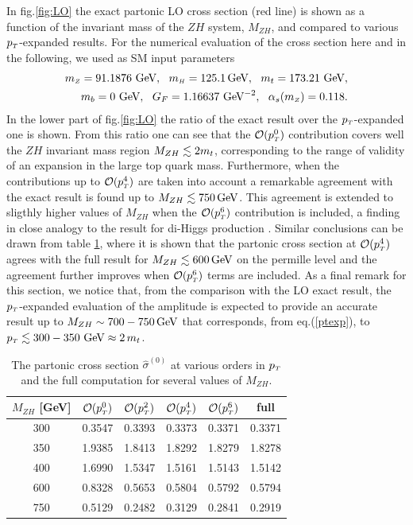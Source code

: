 In fig.\ref{fig:LO} the exact partonic LO cross section (red line) is
shown as a function of the invariant mass of the $ZH$ system, $M_{ZH}$, and
compared to various $p_{\scriptscriptstyle T}$-expanded results. 
For the numerical evaluation of the cross section here and in
the following, we used as SM input parameters
\begin{equation}
	\begin{split}
		m_{ \scriptscriptstyle Z}=91.1876 \,\,\textrm{GeV}, ~~m_{ \scriptscriptstyle H}=125.1 \,\textrm{GeV}, ~~  m_t=173.21\, \,\textrm{GeV}, \nonumber\\
		m_b = 0 \, \,\textrm{GeV}, ~~G_F= 1.16637\,\,\textrm{GeV}^{-2},~~ \alpha_s(m_{ \scriptscriptstyle Z})=0.118.
	\end{split}
\end{equation}
In the lower part of fig.\ref{fig:LO}  the ratio of the
exact result over the $p_{\scriptscriptstyle T}$-expanded one is shown.  From this ratio
one can see that 
the $\mathcal{O}(p_{\scriptscriptstyle T}^0)$ contribution covers well the $ZH$ invariant mass
region $M_{ZH}\lesssim 2m_t$, corresponding to the range of validity of an
expansion in the large top quark mass. Furthermore, when the contributions up to
$\mathcal{O}(p_{\scriptscriptstyle T}^4)$ are taken into account a remarkable agreement with the
exact result is found up to $M_{ZH}\lesssim 750\,\textrm{GeV}$.
This agreement is extended to
sligthly higher values of $M_{ZH}$ when the $\mathcal{O}(p_{\scriptscriptstyle T}^6)$ contribution is
included, a finding in close analogy to the result for di-Higgs
production \cite{Bonciani:2018omm}. Similar conclusions can be drawn from table
\ref{tab:partonic}, where it is shown that the partonic cross section
at $\mathcal{O}(p_{\scriptscriptstyle T}^4)$ agrees with the full result for
$M_{ZH} \lesssim 600 \,\textrm{GeV}$  on the permille level 
and the agreement further improves when $\mathcal{O}(p_{\scriptscriptstyle T}^6)$ terms are included.
As a final remark for this section, we notice that, from the comparison
with the LO exact result, the $p_{\scriptscriptstyle T}$-expanded evaluation of the amplitude is  expected to provide an
accurate result up to $M_{ZH}\sim 700-750\,\textrm{GeV}$ that corresponds, from
eq.(\ref{ptexp}), to $p_{\scriptscriptstyle T} \lesssim 300-350\, \,\textrm{GeV}\approx 2\, m_t$.

\begin{table}
	\renewcommand{\arraystretch}{1.2}
	\centering
	\begin{tabular}{| c| c | c | c| c| c|} \hline
		\rowcolor{lightgray}  $M_{ZH}$ [GeV]  & $\mathcal{O}(p_{\scriptscriptstyle T}^0)$ & $\mathcal{O}(p_{\scriptscriptstyle T}^2)$ & $\mathcal{O}(p_{\scriptscriptstyle T}^4)$ & $\mathcal{O}(p_{\scriptscriptstyle T}^6)$ & full \\ \hline 
		\cellcolor{lightgray} 300 & 0.3547 & 0.3393 &  0.3373 &0.3371& 0.3371 \\
		\cellcolor{lightgray} 350 & 1.9385 & 1.8413& 1.8292 &1.8279& 1.8278 \\
		\cellcolor{lightgray} 400 & 1.6990 & 1.5347 & 1.5161 &1.5143& 1.5142 \\
		\cellcolor{lightgray} 600 & 0.8328 & 0.5653 & 0.5804 &0.5792&  0.5794 \\ 
		\cellcolor{lightgray} 750 & 0.5129 & 0.2482 & 0.3129 & 0.2841 &  0.2919 \\ \hline
	\end{tabular}
	\caption{The partonic cross section $\hat{\sigma}^{(0)}$ at
		various orders in $p_{\scriptscriptstyle T}$ and the full computation for several values of $M_{ZH}$. \label{tab:partonic}}
\end{table}

